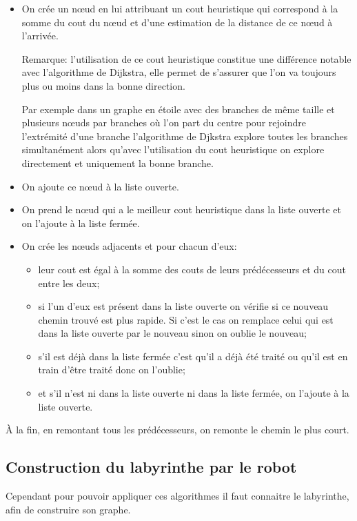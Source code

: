    \begin{itemize}
      \item On crée un nœud en lui attribuant un cout heuristique qui
        correspond à la somme du cout du nœud et d'une estimation de la distance de ce
        nœud à l'arrivée.

        Remarque: l'utilisation de ce cout heuristique constitue une différence
        notable avec l'algorithme de Dijkstra, elle permet de s'assurer que
        l'on va toujours plus ou moins dans la bonne direction.

        Par exemple dans un graphe en étoile avec des branches de même taille
        et plusieurs nœuds par branches où l'on part du centre pour rejoindre
        l'extrémité d'une branche l'algorithme de Djkstra explore toutes les
        branches simultanément alors qu'avec l'utilisation du cout heuristique
        on explore directement et uniquement la bonne branche.
      \item On ajoute ce nœud à la liste ouverte.
      \item On prend le nœud qui a le meilleur cout heuristique dans la liste
        ouverte et on l'ajoute à la liste fermée.
      \item On crée les nœuds adjacents et pour chacun d'eux:
        \begin{itemize}
          \item leur cout est égal à la somme des couts de leurs prédécesseurs
            et du cout entre les deux;
          \item si l'un d'eux est présent dans la liste ouverte on vérifie si
            ce nouveau chemin trouvé est plus rapide. Si c'est le cas on
            remplace celui qui est dans la liste ouverte par le nouveau sinon
            on oublie le nouveau;
          \item s'il est déjà dans la liste fermée c'est qu'il a déjà été
            traité ou qu'il est en train d'être traité donc on l'oublie;
          \item et s'il n'est ni dans la liste ouverte ni dans la liste fermée,
            on l'ajoute à la liste ouverte.
        \end{itemize}
    \end{itemize}
	
    À la fin, en remontant tous les prédécesseurs, on remonte le chemin le plus
    court.

  \subsection{Construction du labyrinthe par le robot}
    Cependant pour pouvoir appliquer ces algorithmes il faut connaitre le
    labyrinthe, afin de construire son graphe.

